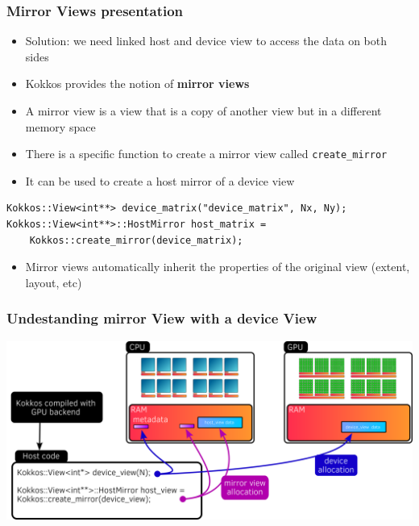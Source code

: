 \documentclass[aspectratio=169]{beamer}
\begin{document}

\begin{frame}[fragile]
    \frametitle{Mirror Views presentation}

\begin{itemize}
    \item Solution: we need linked host and device view to access the data on both sides
    \item Kokkos provides the notion of \textbf{mirror views}
    \item A mirror view is a view that is a copy of another view but in a different memory space
    \item There is a specific function to create a mirror view called \texttt{create\_mirror}
    \item It can be used to create a host mirror of a device view
\end{itemize}

\begin{verbatim}
Kokkos::View<int**> device_matrix("device_matrix", Nx, Ny);
Kokkos::View<int**>::HostMirror host_matrix = 
    Kokkos::create_mirror(device_matrix);
\end{verbatim}

\begin{itemize}
\item Mirror views automatically inherit the properties of the original view (extent, layout, etc)
\end{itemize}

\end{frame}


\begin{frame}[fragile]
    \frametitle{Undestanding mirror View with a device View}

\begin{center}
    \includegraphics[width=\textwidth]{../../images/device_mirror_view.png}
\end{center}

\end{frame}
\end{document}
